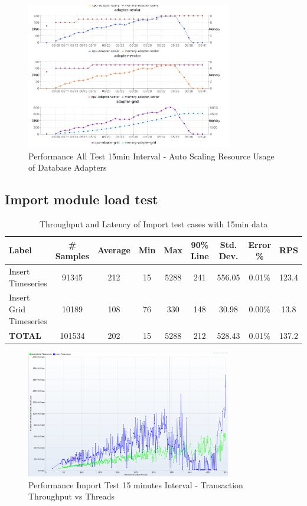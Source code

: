 \begin{figure}[htp]
    \centering
    \includegraphics[width=0.8\textwidth]{results/obs/all_auto/obs_all_auto_15m_adapter_dbs_res.png}
    \caption{Performance All Test 15min Interval - Auto Scaling Resource Usage of Database Adapters }
    \label{fi:obs_all_auto_15m_adapter_dbs_res}
\end{figure}



\subsection{Import module load test}
\begin{table}[]
\begin{tabulary}{\linewidth}{|L|C|C|C|C|C|C|C|C|}
\hline
Label & \# Samples & Average & Min & Max & 90\% Line & Std. Dev. & Error \% & RPS \\ \hline
Insert Timeseries & 91345 & 212 & 15 & 5288 & 241 & 556.05 & 0.01\% & 123.4 \\ \hline
Insert Grid Timeseries & 10189 & 108 & 76 & 330 & 148 & 30.98 & 0.00\% & 13.8 \\ \hline
\textbf{TOTAL} & 101534 & 202 & 15 & 5288 & 212 & 528.43 & 0.01\% & 137.2 \\ \hline
\end{tabulary}
\caption{Throughput and Latency of Import test cases with 15min data}
\label{tab:obs_import_15_min_summary}
\end{table}

\begin{figure}[htp]
    \centering
    \includegraphics[width=0.8\textwidth]{results/obs/import/obs_import_15m_transaction_throughtput_vs_threads.png}
    \caption{Performance Import Test 15 minutes Interval - Transaction Throughput vs Threads}
    \label{fi:test_obs_import_15m_throughtput}
\end{figure}

